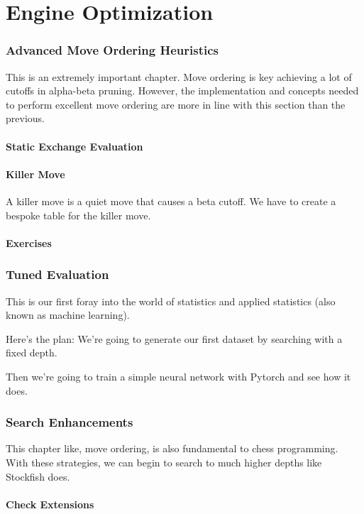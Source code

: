\documentclass[letterpaper,11pt]{article}
\begin{document}
\newpage
\part{Engine Optimization}

\section{Advanced Move Ordering Heuristics}

This is an extremely important chapter.
Move ordering is key achieving a lot of cutoffs in alpha-beta pruning. 
However, the implementation and concepts needed to perform
excellent move ordering are more in line with this section than the previous.

\subsection{Static Exchange Evaluation}
\subsection{Killer Move}
A killer move is a quiet move that causes a beta cutoff.
We have to create a bespoke table for the killer move.
\subsection{Exercises}


\section{Tuned Evaluation}

This is our first foray into the world of statistics and applied statistics (also known as machine learning).

Here's the plan:
We're going to generate our first dataset by searching with a fixed depth.

Then we're going to train a simple neural network with Pytorch and see how it does.

\section{Search Enhancements}

This chapter like, move ordering, is also fundamental to chess programming. With these strategies, 
we can begin to search to much higher depths like Stockfish does.

\subsection{Check Extensions}
\end{document}
